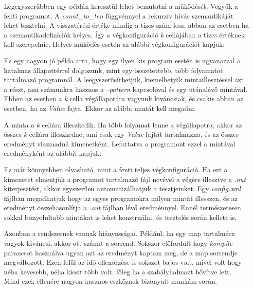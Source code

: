 

Legegyszerűbben egy példán keresztül lehet bemutatni a működését. Vegyük a fenti programot. A \textit{count\_to\_ten} függvénnyel a rekurzív hívás szemantikáját lehet tesztelni. A visszatérési értéke mindig a tízes szám lesz, abban az esetben ha a szemantikadefiníciók helyes. Így a végkonfiguráció \textit{k} cellájában a tízes értéknek kell szerepelnie. Helyes működés esetén az alábbi végkonfigurációt kapjuk:



Ez egy nagyon jó példa arra, hogy egy ilyen kis program esetén is ugyanazzal a hatalmas állapottérrel dolgozunk, mint egy összetettebb, több folyamatot tartalmazó programnál. A leegyszerűsíthetjük, kiemelhetjük mintaillesztéssel azt a részt, ami számunkra hasznos a \textit{--pattern} kapcsolóval és egy utánalévő mintával. Ebben az esetben a \textit{k} cella végállapotára vagyunk kiváncsiak, és csakis abban az esetben, ha az \textit{Value} fajta. Ekkor az alábbi mintát kell megadni:



A minta a \textit{k} cellára illeszkedik. Ha több folyamat lenne a végállapotra, akkor az összes \textit{k} cellára illeszkedne, ami csak egy \textit{Value} fajtát tartalmazna, és az összes eredményt visszaadná kimenetként. Lefuttatva a programont ezzel a mintával eredményként az alábbit kapjuk:



Ez már könnyebben olvasható, mint a fenti teljes végkonfiguráció. Ha ezt a kimenetet elmentjük a programot tartalmazó fájl nevével a végére illesztve a \textit{.out} kiterjesztést, akkor egyszerűen automatizálhatjuk a tesztjeinket. Egy \textit{config.xml} fájlban megadhatjuk hogy az egyes programokra milyen mintát illesszen, és az eredményt összehasonlítja a \textit{.out} fájlban lévő eredménnyel. Ennél természetesen sokkal bonyolultabb mintákat is lehet konstruálni, és tesztelés során kellett is.

Azonban a rendszernek vannak hiányosságai. Például, ha egy map tartalmára vagyok kiváncsi, akkor ott számít a sorrend. Sokszor előfordult hogy \textit{kompile} parancsot használva ugyan azt az eredményt kaptam meg, de a map sorrendje megváltozott. Ezen felül az idő ellenőrzése is sokszot bajos volt, mivel volt hogy néha kevesebb, néha kicsit több volt, főleg ha a szabályhalmazt bővítve lett. Mind ezek ellenére nagyon hasznos eszköznek bizonyult munkám során.

